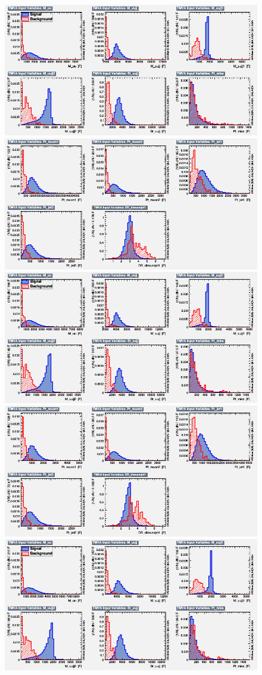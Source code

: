 \begin{figure}[H]
    \centering
    {\includegraphics[width=.49\textwidth]{Images/Analysis/Results_LQToBMu_pair_uubj_BDTG_FullRun2_2023_01_25_020318/1800/variables_id_c1.png}}
    {\includegraphics[width=.49\textwidth]{Images/Analysis/Results_LQToBMu_pair_uubj_BDTG_FullRun2_2023_01_25_020318/1800/variables_id_c2.png}}
    {\includegraphics[width=.49\textwidth]{Images/Analysis/Results_LQToBMu_pair_uubj_BDTG_FullRun2_2023_01_25_020318/1900/variables_id_c1.png}}
    {\includegraphics[width=.49\textwidth]{Images/Analysis/Results_LQToBMu_pair_uubj_BDTG_FullRun2_2023_01_25_020318/1900/variables_id_c2.png}}
    {\includegraphics[width=.49\textwidth]{Images/Analysis/Results_LQToBMu_pair_uubj_BDTG_FullRun2_2023_01_25_020318/2000/variables_id_c1.png}}

\end{figure}
